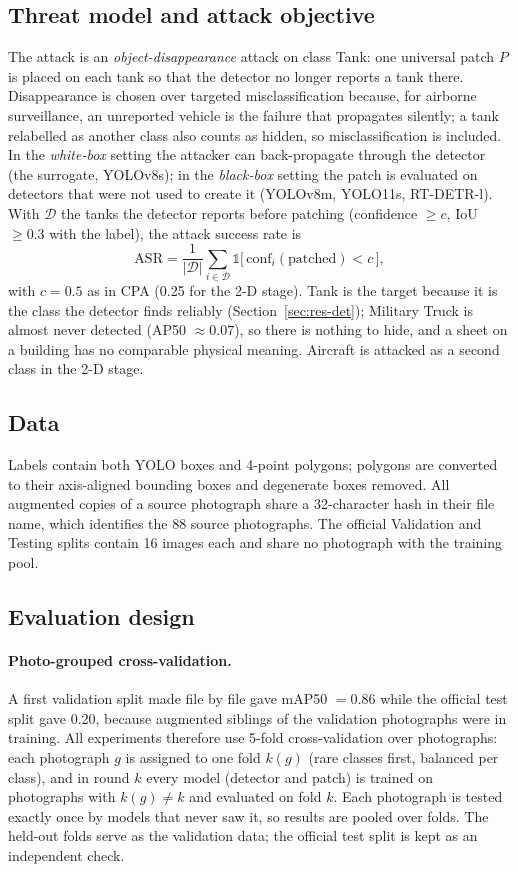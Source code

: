 \documentclass[11pt,a4paper]{article}
\begin{document}
\subsection{Threat model and attack objective}
The attack is an \emph{object-disappearance} attack on class Tank: one universal patch $P$ is placed on each tank so that the detector no longer reports a tank there. Disappearance is chosen over targeted misclassification because, for airborne surveillance, an unreported vehicle is the failure that propagates silently; a tank relabelled as another class also counts as hidden, so misclassification is included. In the \emph{white-box} setting the attacker can back-propagate through the detector (the surrogate, YOLOv8s); in the \emph{black-box} setting the patch is evaluated on detectors that were not used to create it (YOLOv8m, YOLO11s, RT-DETR-l). With $\mathcal{D}$ the tanks the detector reports before patching (confidence $\ge c$, IoU $\ge0.3$ with the label), the attack success rate is
\begin{equation}
\mathrm{ASR}=\frac{1}{|\mathcal{D}|}\sum_{i\in\mathcal{D}}\mathbb{1}\big[\,\mathrm{conf}_i(\text{patched})<c\,\big],
\end{equation}
with $c=0.5$ as in CPA (0.25 for the 2-D stage). Tank is the target because it is the class the detector finds reliably (Section~\ref{sec:res-det}); Military Truck is almost never detected (AP50 $\approx0.07$), so there is nothing to hide, and a sheet on a building has no comparable physical meaning. Aircraft is attacked as a second class in the 2-D stage.

\subsection{Data}\label{sec:data}
Labels contain both YOLO boxes and 4-point polygons; polygons are converted to their axis-aligned bounding boxes and degenerate boxes removed. All augmented copies of a source photograph share a 32-character hash in their file name, which identifies the 88 source photographs. The official Validation and Testing splits contain 16 images each and share no photograph with the training pool.

\subsection{Evaluation design}\label{sec:eval}
\paragraph{Photo-grouped cross-validation.} A first validation split made file by file gave mAP50 $=0.86$ while the official test split gave 0.20, because augmented siblings of the validation photographs were in training. All experiments therefore use 5-fold cross-validation over photographs: each photograph $g$ is assigned to one fold $k(g)$ (rare classes first, balanced per class), and in round $k$ every model (detector and patch) is trained on photographs with $k(g)\neq k$ and evaluated on fold $k$. Each photograph is tested exactly once by models that never saw it, so results are pooled over folds. The held-out folds serve as the validation data; the official test split is kept as an independent check.
\end{document}

